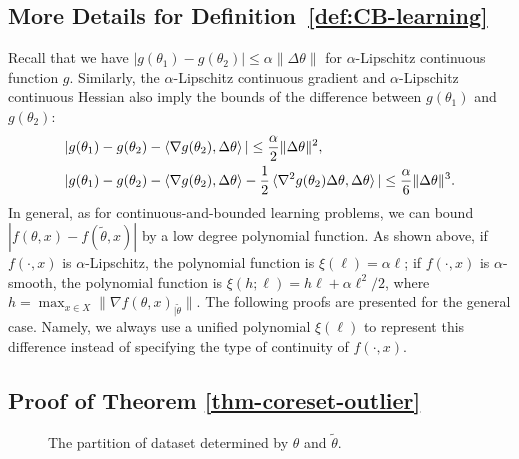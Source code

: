 \subsection{More Details for Definition~\ref{def:CB-learning}}
\label{sec-appcbl}
Recall that we have $ |g(\theta_1)-g(\theta_2)|\leq \alpha \|\Delta\theta \| $ for $ \alpha $-Lipschitz continuous function $ g $. Similarly, the $\alpha $-Lipschitz continuous gradient and $ \alpha $-Lipschitz continuous Hessian also imply the bounds of the difference between $ g(\theta_1) $ and $ g(\theta_2) $: 
\begin{align*}
	&|g(\theta_1)-g(\theta_2)-\braket{\nabla g(\theta_2),\Delta \theta}|\leq \frac{\alpha}{2}\|\Delta \theta\|^2,\\
	&|g(\theta_1)-g(\theta_2)-\braket{\nabla g(\theta_2),\Delta \theta}-\frac{1}{2}\braket{\nabla^2 g(\theta_2)\Delta\theta,\Delta \theta}|\leq \frac{\alpha}{6}\|\Delta \theta\|^3.
\end{align*}
In general, as for continuous-and-bounded learning problems, we can bound $|f(\theta,x)-f(\tilde{\theta},x)| $ by a low degree polynomial function. As shown above, if $ f(\cdot,x) $ is $ \alpha $-Lipschitz, the polynomial function is $ \xi(\ell)=\alpha\ell $; if $ f(\cdot,x) $ is $ \alpha $-smooth, the polynomial function is $ \xi(h;\ell)=h\ell+\alpha\ell^2/2 $, where $ h=\max_{x\in X} \|\nabla f(\theta,x)_{|\tilde{\theta}} \| $. The following proofs are presented for the general case. Namely, we always use a unified polynomial $ \xi(\ell) $ to represent this difference instead of specifying the type of continuity of $f(\cdot,x)$.


\subsection{Proof of Theorem \ref{thm-coreset-outlier}}
\label{sec-appthe2}

\begin{figure}[h]
	\vskip -0.1in
	\caption{The partition of dataset determined by $ \theta $ and $ \tilde{\theta} $.}
	\label{fig:arrange}
\end{figure}

